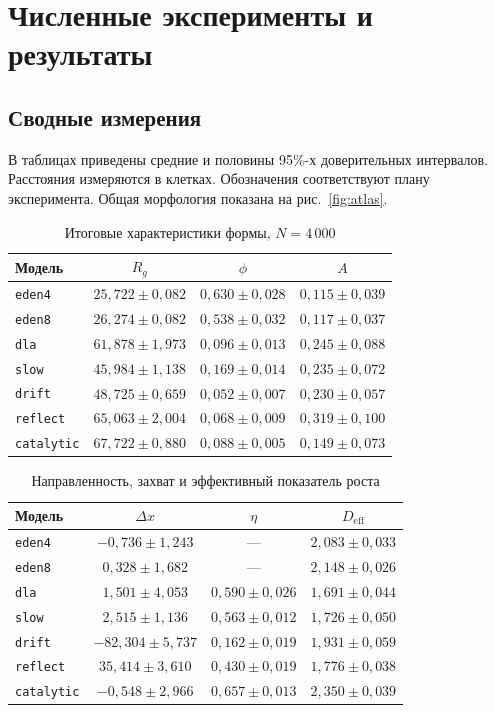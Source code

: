\documentclass[12pt,a4paper]{article}
\begin{document}
\section{Численные эксперименты и результаты}
\subsection{Сводные измерения}
В таблицах приведены средние и половины 95\%-х доверительных интервалов.
Расстояния измеряются в клетках. Обозначения соответствуют плану эксперимента.
Общая морфология показана на рис.~\ref{fig:atlas}.

\begin{table}[htbp]
\centering\small
\caption{Итоговые характеристики формы, $N=4\,000$}
\begin{tabular}{@{}lccc@{}}
\toprule
Модель & $R_g$ & $\phi$ & $A$\\
\midrule
\texttt{eden4} & $25{,}722\pm0{,}082$ & $0{,}630\pm0{,}028$ & $0{,}115\pm0{,}039$\\
\texttt{eden8} & $26{,}274\pm0{,}082$ & $0{,}538\pm0{,}032$ & $0{,}117\pm0{,}037$\\
\texttt{dla} & $61{,}878\pm1{,}973$ & $0{,}096\pm0{,}013$ & $0{,}245\pm0{,}088$\\
\texttt{slow} & $45{,}984\pm1{,}138$ & $0{,}169\pm0{,}014$ & $0{,}235\pm0{,}072$\\
\texttt{drift} & $48{,}725\pm0{,}659$ & $0{,}052\pm0{,}007$ & $0{,}230\pm0{,}057$\\
\texttt{reflect} & $65{,}063\pm2{,}004$ & $0{,}068\pm0{,}009$ & $0{,}319\pm0{,}100$\\
\texttt{catalytic} & $67{,}722\pm0{,}880$ & $0{,}088\pm0{,}005$ & $0{,}149\pm0{,}073$\\
\bottomrule
\end{tabular}
\end{table}

\begin{table}[htbp]
\centering\small
\caption{Направленность, захват и эффективный показатель роста}
\begin{tabular}{@{}lccc@{}}
\toprule
Модель & $\Delta x$ & $\eta$ & $D_{\mathrm{eff}}$\\
\midrule
\texttt{eden4} & $-0{,}736\pm1{,}243$ & --- & $2{,}083\pm0{,}033$\\
\texttt{eden8} & $0{,}328\pm1{,}682$ & --- & $2{,}148\pm0{,}026$\\
\texttt{dla} & $1{,}501\pm4{,}053$ & $0{,}590\pm0{,}026$ & $1{,}691\pm0{,}044$\\
\texttt{slow} & $2{,}515\pm1{,}136$ & $0{,}563\pm0{,}012$ & $1{,}726\pm0{,}050$\\
\texttt{drift} & $-82{,}304\pm5{,}737$ & $0{,}162\pm0{,}019$ & $1{,}931\pm0{,}059$\\
\texttt{reflect} & $35{,}414\pm3{,}610$ & $0{,}430\pm0{,}019$ & $1{,}776\pm0{,}038$\\
\texttt{catalytic} & $-0{,}548\pm2{,}966$ & $0{,}657\pm0{,}013$ & $2{,}350\pm0{,}039$\\
\bottomrule
\end{tabular}
\end{table}
\FloatBarrier
\end{document}

